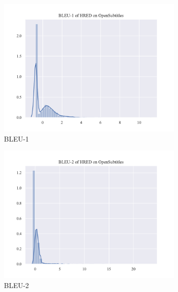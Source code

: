\begin{figure}
    \begin{subfigure}{0.5\linewidth}
        \centering
        \includegraphics[width=\linewidth]{figure/distplot/opensub/hred/bleu_1/plot.pdf}
        \caption{BLEU-1}
    \end{subfigure}%
    \begin{subfigure}{0.5\linewidth}
        \centering
        \includegraphics[width=\linewidth]{figure/distplot/opensub/hred/bleu_2/plot.pdf}
        \caption{BLEU-2}
    \end{subfigure}
    \begin{subfigure}{0.5\linewidth}
        \centering

\end{subfigure}
\end{figure}
